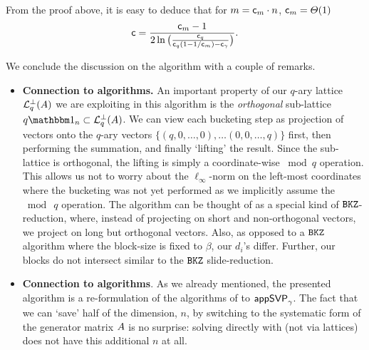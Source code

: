 \begin{remark}\label{rmk:Linm}
	From the proof above, it is easy to deduce that for $m=\mathsf{c}_m \cdot n$, $\mathsf{c}_m = \varTheta(1)$
 	\[
		\mathsf{c} = \frac{\mathsf{c}_m -1 }{2 \ln \big( \frac{\mathsf{c}_q}{\mathsf{c}_q (1-1/\mathsf{c}_m) - \mathsf{c}_{\gamma}} \big)}.
	\]
\end{remark}
We conclude the discussion on the algorithm with a couple of remarks.
	\begin{itemize}
		\setlength{\itemsep}{0pt}
		  \setlength{\parskip}{0pt}
		\item \textbf{Connection to \BKZ algorithms.} An important property of our $q$-ary lattice $\mathcal{L}_q^{\perp}(A)$ we are exploiting in this algorithm is the \emph{orthogonal} sub-lattice $q\Id_n \subset \qLATTp(A)$. We can view each bucketing step as projection of vectors onto the $q$-ary vectors $\{(q, 0, \ldots, 0), \ldots (0, 0, \ldots, q)\}$ first, then performing the summation, and finally `lifting' the result. Since the sub-lattice is orthogonal, the lifting is simply a coordinate-wise $\bmod q$ operation. This allows us not to worry about the $\ell_{\infty}$-norm on the left-most coordinates where the bucketing was not yet performed as we implicitly assume the $\bmod~q$ operation. The algorithm can be thought of as a special kind of $\texttt{BKZ}$-reduction, where, instead of projecting on short and non-orthogonal vectors, we project on long but orthogonal vectors. Also, as opposed to a $\texttt{BKZ}$ algorithm where the block-size is fixed to $\beta$, our $d_i$'s differ. Further, our blocks do not intersect similar to the $\texttt{BKZ}$ slide-reduction.\\
		\item \textbf{Connection to \BKW algorithms}. As we already mentioned, the presented algorithm is a re-formulation of the \BKW algorithms of \cite{C:KirFou15, C:GuoJohSta15} to $\textsf{appSVP}_{\gamma}$. The fact that we can `save' half of the dimension, $n$, by switching to the systematic form of the generator matrix $A$ is no surprise: solving \LWE directly with \BKW (not via lattices) does not have this additional $n$ at all. 
	\end{itemize}

